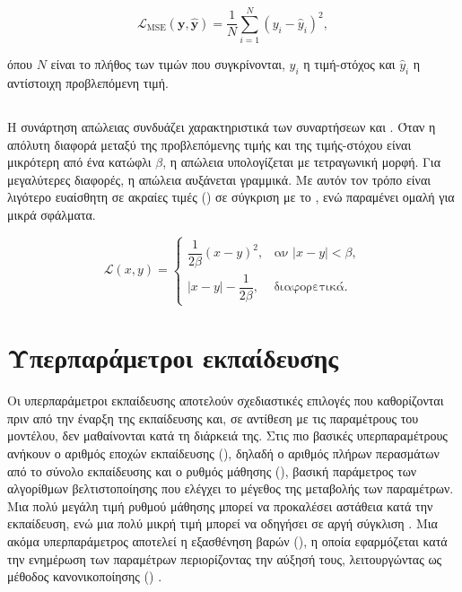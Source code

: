 \begin{equation}
    \mathcal{L}_{\mathrm{MSE}}(\mathbf{y},\hat{\mathbf{y}})
    =
    \frac{1}{N}
    \sum_{i=1}^{N}
    \left(y_i-\hat{y}_i\right)^2,
    \label{eq:mse-loss}
\end{equation}

όπου \(N\) είναι το πλήθος των τιμών που συγκρίνονται, \(y_i\) η τιμή-στόχος
και \(\hat{y}_i\) η αντίστοιχη προβλεπόμενη τιμή.

\subsection{}
\label{subsec:smooth-l1-loss}

Η συνάρτηση απώλειας  \cite{girshick2015fast} συνδυάζει
χαρακτηριστικά των συναρτήσεων  και . Όταν η απόλυτη διαφορά
μεταξύ της προβλεπόμενης τιμής και της τιμής-στόχου είναι μικρότερη από
ένα κατώφλι \(\beta\), η απώλεια υπολογίζεται με τετραγωνική μορφή. Για
μεγαλύτερες διαφορές, η απώλεια αυξάνεται γραμμικά. Με αυτόν τον τρόπο
είναι λιγότερο ευαίσθητη σε ακραίες τιμές () σε σύγκριση με
το , ενώ παραμένει ομαλή για μικρά σφάλματα.

\begin{equation}
    \mathcal{L}(x,y)
    =
    \begin{cases}
        \dfrac{1}{2\beta}(x-y)^2, & \text{αν } |x-y| < \beta, \\[6pt]
        |x-y|-\dfrac{1}{2\beta}, & \text{διαφορετικά}.
    \end{cases}
    \label{eq:smooth-l1-loss}
\end{equation}

\section{Υπερπαράμετροι εκπαίδευσης}
\label{subsec:training-hyperparameters}

Οι υπερπαράμετροι εκπαίδευσης αποτελούν σχεδιαστικές επιλογές που
καθορίζονται πριν από την έναρξη της εκπαίδευσης και, σε αντίθεση με
τις παραμέτρους του μοντέλου, δεν μαθαίνονται κατά τη διάρκειά της.
Στις πιο βασικές υπερπαραμέτρους ανήκουν ο αριθμός εποχών εκπαίδευσης
(), δηλαδή ο αριθμός πλήρων περασμάτων από το
σύνολο εκπαίδευσης και ο ρυθμός μάθησης (), βασική
παράμετρος των αλγορίθμων βελτιστοποίησης που ελέγχει το μέγεθος της
μεταβολής των παραμέτρων. Μια πολύ μεγάλη τιμή ρυθμού μάθησης μπορεί
να προκαλέσει αστάθεια κατά την εκπαίδευση, ενώ μια πολύ μικρή τιμή
μπορεί να οδηγήσει σε αργή σύγκλιση \cite{goodfellow2016deep}. Μια
ακόμα υπερπαράμετρος αποτελεί η εξασθένηση βαρών (),
η οποία εφαρμόζεται κατά την ενημέρωση των παραμέτρων περιορίζοντας
την αύξησή τους, λειτουργώντας ως μέθοδος κανονικοποίησης
() \cite{goodfellow2016deep}.

